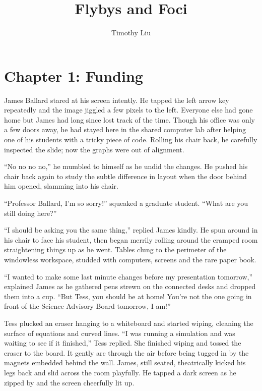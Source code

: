 \documentclass[12pt]{article} %
\title{Flybys and Foci}
\author{Timothy Liu}
\begin{document}
\maketitle

\newpage
\tableofcontents
\newpage

\section{Chapter 1: Funding}
James Ballard stared at his screen intently. He tapped the left arrow key repeatedly and the image jiggled a few pixels to the left. Everyone else had gone home but James had long since lost track of the time. Though his office was only a few doors away, he had stayed here in the shared computer lab after helping one of his students with a tricky piece of code. Rolling his chair back, he carefully inspected the slide; now the graphs were out of alignment.

``No no no no,'' he mumbled to himself as he undid the changes. He pushed his chair back again to study the subtle difference in layout when the door behind him opened, slamming into his chair.

``Professor Ballard, I'm so sorry!'' squeaked a graduate student. ``What are you still doing here?''

``I should be asking you the same thing,'' replied James kindly. He spun around in his chair to face his student, then began merrily rolling around the cramped room straightening things up as he went. Tables clung to the perimeter of the windowless workspace, studded with computers, screens and the rare paper book.

``I wanted to make some last minute changes before my presentation tomorrow,'' explained James as he gathered pens strewn on the connected desks and dropped them into a cup. ``But Tess, you should be at home! You're not the one going in front of the Science Advisory Board tomorrow, I am!''

Tess plucked an eraser hanging to a whiteboard and started wiping, cleaning the surface of equations and curved lines. ``I was running a simulation and was waiting to see if it finished,'' Tess replied. She finished wiping and tossed the eraser to the board. It gently arc through the air before being tugged in by the magnets embedded behind the wall. James, still seated, theatrically kicked his legs back  and slid across the room playfully. He tapped a dark screen as he zipped by and the screen cheerfully lit up.
\end{document}

